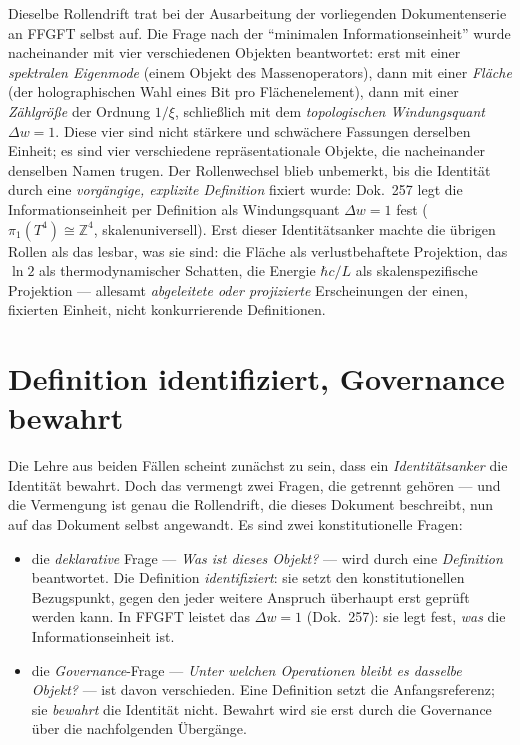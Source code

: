 Dieselbe Rollendrift trat bei der Ausarbeitung der vorliegenden Dokumentenserie an FFGFT
selbst auf. Die Frage nach der \enquote{minimalen Informationseinheit} wurde nacheinander
mit vier verschiedenen Objekten beantwortet: erst mit einer \emph{spektralen Eigenmode}
(einem Objekt des Massenoperators), dann mit einer \emph{Fläche} (der holographischen
Wahl eines Bit pro Flächenelement), dann mit einer \emph{Zählgröße} der Ordnung
$1/\xi$, schließlich mit dem \emph{topologischen Windungsquant} $\Delta w = 1$. Diese
vier sind nicht stärkere und schwächere Fassungen derselben Einheit; es sind vier
verschiedene repräsentationale Objekte, die nacheinander denselben Namen trugen. Der
Rollenwechsel blieb unbemerkt, bis die Identität durch eine \emph{vorgängige, explizite
Definition} fixiert wurde: Dok.~257 legt die Informationseinheit per Definition als
Windungsquant $\Delta w = 1$ fest ($\pi_1(T^4) \cong \mathbb{Z}^4$, skalenuniversell).
Erst dieser Identitätsanker machte die übrigen Rollen als das lesbar, was sie sind: die
Fläche als verlustbehaftete Projektion, das $\ln 2$ als thermodynamischer Schatten, die
Energie $\hbar c/L$ als skalenspezifische Projektion --- allesamt \emph{abgeleitete oder
projizierte} Erscheinungen der einen, fixierten Einheit, nicht konkurrierende
Definitionen.

\section{Definition identifiziert, Governance bewahrt}

Die Lehre aus beiden Fällen scheint zunächst zu sein, dass ein \emph{Identitätsanker}
die Identität bewahrt. Doch das vermengt zwei Fragen, die getrennt gehören --- und die
Vermengung ist genau die Rollendrift, die dieses Dokument beschreibt, nun auf das
Dokument selbst angewandt. Es sind zwei konstitutionelle Fragen:

\begin{itemize}
\item die \emph{deklarative} Frage --- \emph{Was ist dieses Objekt?} --- wird durch eine
\emph{Definition} beantwortet. Die Definition \emph{identifiziert}: sie setzt den
konstitutionellen Bezugspunkt, gegen den jeder weitere Anspruch überhaupt erst geprüft
werden kann. In FFGFT leistet das $\Delta w = 1$ (Dok.~257): sie legt fest, \emph{was}
die Informationseinheit ist.
\item die \emph{Governance}-Frage --- \emph{Unter welchen Operationen bleibt es dasselbe
Objekt?} --- ist davon verschieden. Eine Definition setzt die Anfangsreferenz; sie
\emph{bewahrt} die Identität nicht. Bewahrt wird sie erst durch die Governance über die
nachfolgenden Übergänge.
\end{itemize}

